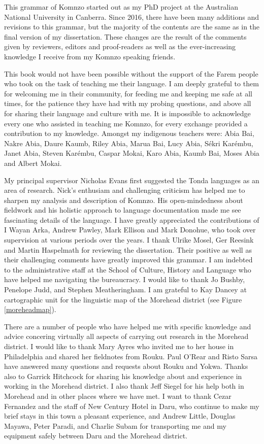 

This grammar of Komnzo started out as my PhD project at the Australian National University in Canberra. Since 2016, there have been many additions and revisions to this grammar, but the majority of the contents are the same as in the final version of my dissertation. These changes are the result of the comments given by reviewers, editors and proof-readers as well as the ever-increasing knowledge I receive from my Komnzo speaking friends.

This book would not have been possible without the support of the Farem people who took on the task of teaching me their language. I am deeply grateful to them for welcoming me in their community, for feeding me and keeping me safe at all times, for the patience they have had with my probing questions, and above all for sharing their language and culture with me. It is impossible to acknowledge every one who assisted in teaching me Komnzo, for every exchange provided a contribution to my knowledge. Amongst my indigenous teachers were: Abia Bai, Nakre Abia, Daure Kaumb, Riley Abia, \textsuperscript{\dag}Marua Bai, Lucy Abia, Sékri Karémbu, Janet Abia, Steven Karémbu, Caspar Mokai, Karo Abia, Kaumb Bai, Moses Abia and Albert Mokai.

My principal supervisor Nicholas Evans first suggested the Tonda languages as an area of research. Nick's enthusiam and challenging criticism has helped me to sharpen my analysis and description of Komnzo. His open-mindedness about fieldwork and his holistic approach to language documentation made me see fascinating details of the language. I have greatly appreciated the contributions of I Wayan Arka, Andrew Pawley, Mark Ellison and Mark Donohue, who took over supervision at various periods over the years. I thank Ulrike Mosel, Ger Reesink and Martin Haspelmath for reviewing the dissertation. Their positive as well as their challenging comments have greatly improved this grammar. I am indebted to the administrative staff at the School of Culture, History and Language who have helped me navigating the bureaucracy. I would like to thank Jo Bushby, Penelope Judd, and Stephen Meatheringham. I am grateful to Kay Dancey at cartographic unit for the linguistic map of the Morehead district (see Figure \ref{moreheadmap}).

There are a number of people who have helped me with specific knowledge and advice concering virtually all aspects of carrying out research in the Morehead district. I would like to thank Mary Ayres who invited me to her house in Philadelphia and shared her fieldnotes from Rouku. Paul O'Rear and Risto Sarsa have answered many questions and requests about Rouku and Yokwa. Thanks also to Garrick Hitchcock for sharing his knowledge about and experience in working in the Morehead district. I also thank Jeff Siegel for his help both in Morehead and in other places where we have met. I want to thank Cezar Fernandez and the staff of New Century Hotel in Daru, who continue to make my brief stays in this town a pleasant experience, and Andrew Little, Douglas Mayawa, Peter Paradi, and Charlie Subam for transporting me and my equipment safely between Daru and the Morehead district.

